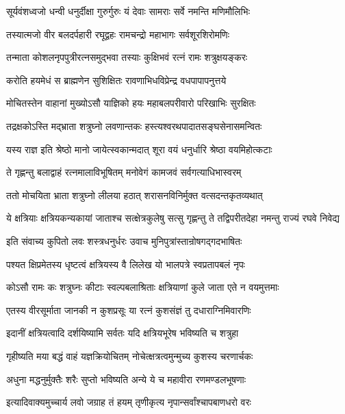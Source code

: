 \twolineshloka
{सूर्यवंशध्वजो धन्वी धनुर्दीक्षा गुरुर्गुरुः}
{यं देवाः सामराः सर्वे नमन्ति मणिमौलिभिः}%

\twolineshloka
{तस्यात्मजो वीर बलदर्पहारी रघूद्वहः}
{रामचन्द्रो महाभागः सर्वशूरशिरोमणिः}%

\twolineshloka
{तन्माता कोशलनृपपुत्रीरत्नसमुद्भवा}
{तस्याः कुक्षिभवं रत्नं रामः शत्रुक्षयङ्करः}%

\twolineshloka
{करोति हयमेधं स ब्राह्मणेन सुशिक्षितः}
{रावणाभिधविप्रेन्द्र वधपापापनुत्तये}%

\twolineshloka
{मोचितस्तेन वाहानां मुख्योऽसौ याज्ञिको हयः}
{महाबलपरीवारो परिखाभिः सुरक्षितः}%

\twolineshloka
{तद्रक्षकोऽस्ति मद्भ्राता शत्रुघ्नो लवणान्तकः}
{हस्त्यश्वरथपादातसङ्घसेनासमन्वितः}%

\twolineshloka
{यस्य राज्ञ इति श्रेष्ठो मानो जायेत्स्वकान्मदात्}
{शूरा वयं धनुर्धारि श्रेष्ठा वयमिहोत्कटाः}%

\twolineshloka
{ते गृह्णन्तु बलाद्वाहं रत्नमालाविभूषितम्}
{मनोवेगं कामजवं सर्वगत्याधिभास्वरम्}%

\twolineshloka
{ततो मोचयिता भ्राता शत्रुघ्नो लीलया हठात्}
{शरासनविनिर्मुक्त वत्सदन्तकृतव्यथात्}%

\fourlineindentedshloka
{ये क्षत्रियाः क्षत्रियकन्यकायां}
{जाताश्च सत्क्षेत्रकुलेषु सत्सु}
{गृह्णन्तु ते तद्विपरीतदेहा}
{नमन्तु राज्यं रघवे निवेद्य}%

\twolineshloka
{इति संवाच्य कुपितो लवः शस्त्रधनुर्धरः}
{उवाच मुनिपुत्रांस्तान्रोषगद्गदभाषितः}%

\twolineshloka
{पश्यत क्षिप्रमेतस्य धृष्टत्वं क्षत्रियस्य वै}
{लिलेख यो भालपत्रे स्वप्रतापबलं नृपः}%

\twolineshloka
{कोऽसौ रामः कः शत्रुघ्नः कीटाः स्वल्पबलाश्रिताः}
{क्षत्रियाणां कुले जाता एते न वयमुत्तमाः}%

\twolineshloka
{एतस्य वीरसूर्माता जानकी न कुशप्रसूः}
{या रत्नं कुशसंज्ञं तु दधाराग्निमिवारणिः}%

\twolineshloka
{इदानीं क्षत्रियत्वादि दर्शयिष्यामि सर्वतः}
{यदि क्षत्रियभूरेष भविष्यति च शत्रुहा}%

\twolineshloka
{गृहीष्यति मया बद्धं वाहं यज्ञक्रियोचितम्}
{नोचेत्क्षत्रत्वमुन्मुच्य कुशस्य चरणार्चकः}%

\twolineshloka
{अधुना मद्धनुर्मुक्तैः शरैः सुप्तो भविष्यति}
{अन्ये ये च महावीरा रणमण्डलभूषणाः}%

\twolineshloka
{इत्यादिवाक्यमुच्चार्य लवो जग्राह तं हयम्}
{तृणीकृत्य नृपान्सर्वांश्चापबाणधरो वरः}%

